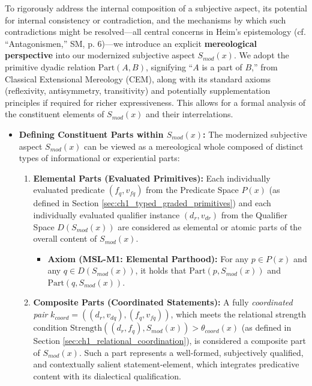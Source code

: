 \documentclass[
    12pt,              %
    a4paper,           %
    headings=normal,   %
    twoside=true,      %
    BCOR=8mm,          %
]{scrbook}
\newcommand{\q}[1]{\enquote{#1}}
\begin{document}
To rigorously address the internal composition of a subjective aspect, its potential for internal consistency or contradiction, and the mechanisms by which such contradictions might be resolved—all central concerns in Heim's epistemology (cf. \q{Antagonismen,} SM, p. 6)—we introduce an explicit \textbf{mereological perspective} into our modernized subjective aspect \(S_{mod}(x)\). We adopt the primitive dyadic relation \(\text{Part}(A,B)\), signifying \q{\(A\) is a part of \(B\),} from Classical Extensional Mereology (CEM), along with its standard axioms (reflexivity, antisymmetry, transitivity) and potentially supplementation principles if required for richer expressiveness. This allows for a formal analysis of the constituent elements of \(S_{mod}(x)\) and their interrelations.

\begin{itemize}
    \item   \textbf{Defining Constituent Parts within \(S_{mod}(x)\):}
        The modernized subjective aspect \(S_{mod}(x)\) can be viewed as a mereological whole composed of distinct types of informational or experiential parts:
        \begin{enumerate}[label=(\alph*)]
            \item  \textbf{Elemental Parts (Evaluated Primitives):} Each individually evaluated predicate \((f_q, v_{fq})\) from the Predicate Space \(P(x)\) (as defined in Section \ref{sec:ch1_typed_graded_primitives}) and each individually evaluated qualifier instance \((d_r, v_{dr})\) from the Qualifier Space \(D(S_{mod}(x))\) are considered as elemental or atomic parts of the overall content of \(S_{mod}(x)\).
                \begin{itemize}
                    \item   \textbf{Axiom (MSL-M1: Elemental Parthood):} For any \(p \in P(x)\) and any \(q \in D(S_{mod}(x))\), it holds that \(\text{Part}(p, S_{mod}(x))\) and \(\text{Part}(q, S_{mod}(x))\).
                \end{itemize}
            \item  \textbf{Composite Parts (Coordinated Statements):} A fully \textit{coordinated pair} \(k_{coord} = ((d_r, v_{dq}), (f_q, v_{fq}))\), which meets the relational strength condition \(\text{Strength}((d_r,f_q), S_{mod}(x)) > \theta_{coord}(x)\) (as defined in Section \ref{sec:ch1_relational_coordination}), is considered a composite part of \(S_{mod}(x)\). Such a part represents a well-formed, subjectively qualified, and contextually salient statement-element, which integrates predicative content with its dialectical qualification.

\end{enumerate}
\end{itemize}
\end{document}
